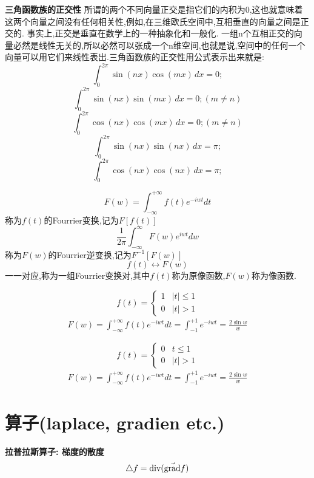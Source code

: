 \documentclass{book}
\begin{document}
\textbf{三角函数族的正交性}
所谓的两个不同向量正交是指它们的内积为0,这也就意味着这两个向量之间没有任何相关性,例如,在三维欧氏空间中,互相垂直的向量之间是正交的.
事实上,正交是垂直在数学上的一种抽象化和一般化.
一组n个互相正交的向量必然是线性无关的,所以必然可以张成一个n维空间,也就是说,空间中的任何一个向量可以用它们来线性表出.三角函数族的正交性用公式表示出来就是:
$$\int _{0}^{2\pi}\sin (nx)\cos (mx) \,dx=0;$$
$$\int _{0}^{2\pi}\sin (nx)\sin (mx) \,dx=0;(m\ne n)$$
$$\int _{0}^{2\pi}\cos (nx)\cos (mx) \,dx=0;(m\ne n)$$
$$\int _{0}^{2\pi}\sin (nx)\sin (nx) \,dx=\pi;$$
$$\int _{0}^{2\pi}\cos (nx)\cos (nx) \,dx=\pi;$$
\bigskip

$$F(w)=\int_{-\infty}^{+\infty}f(t)e^{-iwt}dt$$
称为$f(t)$的Fourrier变换,记为$F[f(t)]$
$$\frac{ 1}{2\pi}\int_{-\infty}^{\infty}F(w)e^{iwt}dw$$称为$F(w)$的Fourrier逆变换,记为$F^{-1}[F(w)]$
$$f(t) \longleftrightarrow F(w)$$一一对应,称为一组Fourrier变换对,其中$f(t)$称为原像函数,$F(w)$称为像函数.
\begin{example}
\begin{equation}
f(t)=
\left\{
		\begin{array}{ll}
			1 & |t| \leq 1 \\
			0 & |t| > 1
		\end{array}
		\right.
\end{equation}
\begin{eqnarray}
 F(w)=\int_{-\infty}^{+\infty} f(t)e^{-iwt}dt=\int_{-1}^{+1}e^{-iwt}=\frac{2\sin w}{w}
\end{eqnarray}
\end{example}

\begin{example}
\begin{equation}
f(t)=
\left\{
		\begin{array}{ll}
			0 & t \leq 1 \\
			0 & |t| > 1
		\end{array}
		\right.
\end{equation}
\begin{eqnarray}
 F(w)=\int_{-\infty}^{+\infty} f(t)e^{-iwt}dt=\int_{-1}^{+1}e^{-iwt}=\frac{2\sin w}{w}
\end{eqnarray}
\end{example}

\section{算子(laplace, gradien etc.)}
\textbf{拉普拉斯算子: 梯度的散度}
$$\mathop{}\!\mathbin\bigtriangleup f = \mbox{div} (\vec{\mbox{grad}}f)$$
\end{document}
